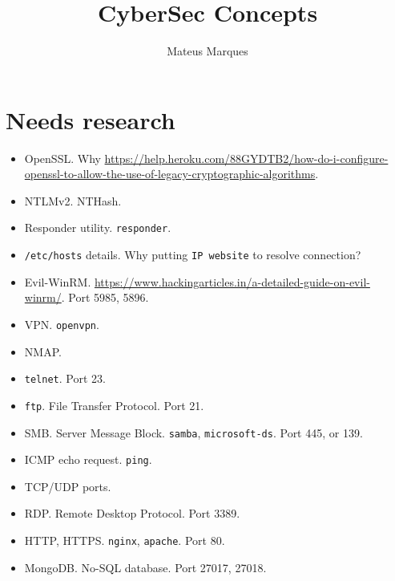 \documentclass[a4paper,10pt]{article}
\title{\Huge{\textbf{CyberSec Concepts}}}
\author{Mateus Marques}
\begin{document}
\maketitle

\section{Needs research}

\begin{itemize}
\item OpenSSL. Why \url{https://help.heroku.com/88GYDTB2/how-do-i-configure-openssl-to-allow-the-use-of-legacy-cryptographic-algorithms}.

\item NTLMv2. NTHash.

\item Responder utility. \texttt{responder}.

\item \texttt{/etc/hosts} details. Why putting \texttt{IP   website} to resolve connection?

\item Evil-WinRM. \url{https://www.hackingarticles.in/a-detailed-guide-on-evil-winrm/}. Port 5985, 5896.

\item VPN. \texttt{openvpn}.

\item NMAP.

\item \texttt{telnet}. Port 23.

\item \texttt{ftp}. File Transfer Protocol. Port 21.

\item SMB. Server Message Block. \texttt{samba}, \texttt{microsoft-ds}. Port 445, or 139.

\item ICMP echo request. \texttt{ping}.

\item TCP/UDP ports.

\item RDP. Remote Desktop Protocol. Port 3389.

\item HTTP, HTTPS. \texttt{nginx}, \texttt{apache}. Port 80.

\item MongoDB. No-SQL database. Port 27017, 27018.


\end{itemize}
\end{document}
